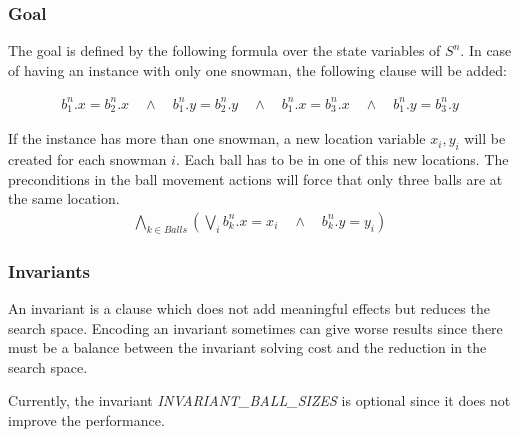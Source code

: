 \documentclass{report}
\theoremstyle{plain}
\begin{document}
\subsubsection{Goal}
The goal is defined by the following formula over the state variables of $S^n$. In case of having an instance with only one snowman, the following clause will be added:

\begin{align*}
b_1^n.x = b_2^n.x \quad \wedge \quad b_1^n.y = b_2^n.y \quad \wedge \quad b_1^n.x = b_3^n.x \quad \wedge \quad b_1^n.y = b_3^n.y
\end{align*}

If the instance has more than one snowman, a new location variable $x_i, y_i$ will be created for each snowman $i$. Each ball has to be in one of this new locations. The preconditions in the ball movement actions will force that only three balls are at the same location.
\begin{gather*}
\bigwedge \limits_{k \in Balls}(\bigvee \limits_{i} b_k^n.x = x_i \quad \wedge \quad b_k^n.y = y_i) 
\end{gather*}

\subsubsection{Invariants}
An invariant is a clause which does not add meaningful effects but reduces the search space. Encoding an invariant sometimes can give worse results since there must be a balance between the invariant solving cost and the reduction in the search space.

Currently, the invariant \textit{INVARIANT\_BALL\_SIZES} is optional since it does not improve the performance.

\vspace{1\baselineskip}

\newpage
\end{document}
